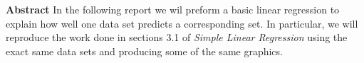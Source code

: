 \documentclass{article}
\begin{document}



\begin{Schunk}
\end{Schunk}



\textbf{Abstract}
In the following report we wil preform a basic linear regression to explain how well one data set predicts a corresponding set. In particular, we will reproduce the work done in sections 3.1 of \emph{Simple Linear Regression} using the exact same data sets and producing some of the same graphics.
\end{document}
